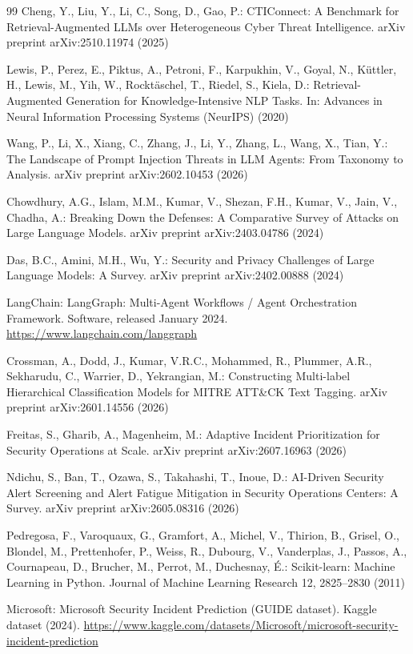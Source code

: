 \documentclass[twocolumn]{svjour3}
\begin{document}
\begin{thebibliography}{99}
Cheng, Y., Liu, Y., Li, C., Song, D., Gao, P.: CTIConnect: A Benchmark for Retrieval-Augmented LLMs over Heterogeneous Cyber Threat Intelligence. arXiv preprint arXiv:2510.11974 (2025)

Lewis, P., Perez, E., Piktus, A., Petroni, F., Karpukhin, V., Goyal, N., K\"uttler, H., Lewis, M., Yih, W., Rockt\"aschel, T., Riedel, S., Kiela, D.: Retrieval-Augmented Generation for Knowledge-Intensive NLP Tasks. In: Advances in Neural Information Processing Systems (NeurIPS) (2020)

Wang, P., Li, X., Xiang, C., Zhang, J., Li, Y., Zhang, L., Wang, X., Tian, Y.: The Landscape of Prompt Injection Threats in LLM Agents: From Taxonomy to Analysis. arXiv preprint arXiv:2602.10453 (2026)

Chowdhury, A.G., Islam, M.M., Kumar, V., Shezan, F.H., Kumar, V., Jain, V., Chadha, A.: Breaking Down the Defenses: A Comparative Survey of Attacks on Large Language Models. arXiv preprint arXiv:2403.04786 (2024)

Das, B.C., Amini, M.H., Wu, Y.: Security and Privacy Challenges of Large Language Models: A Survey. arXiv preprint arXiv:2402.00888 (2024)

LangChain: LangGraph: Multi-Agent Workflows / Agent Orchestration Framework. Software, released January 2024. \url{https://www.langchain.com/langgraph}

Crossman, A., Dodd, J., Kumar, V.R.C., Mohammed, R., Plummer, A.R., Sekharudu, C., Warrier, D., Yekrangian, M.: Constructing Multi-label Hierarchical Classification Models for MITRE ATT\&CK Text Tagging. arXiv preprint arXiv:2601.14556 (2026)

Freitas, S., Gharib, A., Magenheim, M.: Adaptive Incident Prioritization for Security Operations at Scale. arXiv preprint arXiv:2607.16963 (2026)

Ndichu, S., Ban, T., Ozawa, S., Takahashi, T., Inoue, D.: AI-Driven Security Alert Screening and Alert Fatigue Mitigation in Security Operations Centers: A Survey. arXiv preprint arXiv:2605.08316 (2026)

Pedregosa, F., Varoquaux, G., Gramfort, A., Michel, V., Thirion, B., Grisel, O., Blondel, M., Prettenhofer, P., Weiss, R., Dubourg, V., Vanderplas, J., Passos, A., Cournapeau, D., Brucher, M., Perrot, M., Duchesnay, \'E.: Scikit-learn: Machine Learning in Python. Journal of Machine Learning Research 12, 2825--2830 (2011)

Microsoft: Microsoft Security Incident Prediction (GUIDE dataset). Kaggle dataset (2024). \url{https://www.kaggle.com/datasets/Microsoft/microsoft-security-incident-prediction}

\end{thebibliography}
\end{document}
